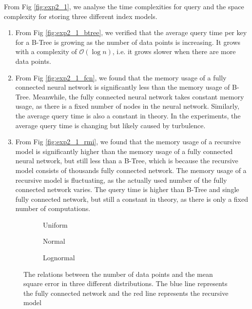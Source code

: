\begin{mscconclusion}
	From Fig \ref{fig:exp2_1}, we analyse the time complexities for query and the space complexity for storing three different index models.
	
	\begin{enumerate}
	\item From Fig \ref{fig:exp2_1_btree}, we verified that the average query time per key for a B-Tree is growing as the number of data points is increasing. It grows with a complexity of $\mathcal{O}(\log n)$, i.e. it grows slower when there are more data points. 
	\item From Fig \ref{fig:exp2_1_fcn}, we found that the memory usage of a fully connected neural network is significantly less than the memory usage of B-Tree. Meanwhile, the fully connected neural network takes constant memory usage, as there is a fixed number of nodes in the neural network. Similarly, the average query time is also a constant in theory. In the experiments, the average query time is changing but likely caused by turbulence.
	\item From Fig \ref{fig:exp2_1_rmi}, we found that the memory usage of a recursive model is significantly higher than the memory usage of a fully connected neural network, but still less than a B-Tree, which is because the recursive model consists of thousands fully connected network. The memory usage of a recursive model is fluctuating, as the actually used number of the fully connected network varies. The query time is higher than B-Tree and single fully connected network, but still a constant in theory, as there is only a fixed number of computations.
	\end{enumerate}
\end{mscconclusion}

\begin{figure}
 \centering
     \begin{subfigure}[b]{0.3\textwidth}
         \centering
         
         \caption{Uniform}
         \label{fig:exp2_2_uniform}
     \end{subfigure}
     \hfill
     \begin{subfigure}[b]{0.3\textwidth}
         \centering
         
         \caption{Normal}
         \label{fig:exp2_2_normal}
     \end{subfigure}
     \hfill
     \begin{subfigure}[b]{0.3\textwidth}
         \centering
         
         \caption{Lognormal}
         \label{fig:exp2_2_lognormal}
     \end{subfigure}
        \caption{The relations between the number of data points and the mean square error in three different distributions. The blue line represents the fully connected network and the red line represents the recursive model}
        \label{fig:exp2_2}
\end{figure}

